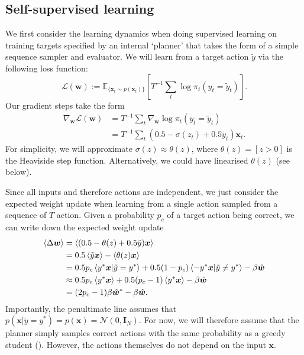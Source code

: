\documentclass{article}
\renewcommand\b\bm
\begin{document}
\subsection*{Self-supervised learning}

We first consider the learning dynamics when doing supervised learning on training targets specified by an internal `planner' that takes the form of a simple sequence sampler and evaluator.
We will learn from a target action $\tilde{y}$ via the following loss function:
\begin{equation}
    \mathcal{L}(\b{w}) := \mathbb{E}_{ \{ \b{x}_t \sim p(\b{x}_t) \} } \left [ T^{-1} \sum_t \log \pi_t (y_t = \tilde{y}_t) \right ].
\end{equation}
Our gradient steps take the form
\begin{align}
    \nabla_{\b{w}} \mathcal{L}(\b{w}) &= T^{-1} \sum_t \nabla_{\b{w}} \log \pi_t (y_t = \tilde{y}_t) \\
    &= T^{-1} \sum_t (0.5-\sigma(z_t)+0.5 \tilde{y}_t) \b{x}_t.
\end{align}
For simplicity, we will approximate $\sigma(z) \approx \theta(z)$, where $\theta(z) = [z > 0]$ is the Heaviside step function.
Alternatively, we could have linearised $\theta (z)$ (see below).

Since all inputs and therefore actions are independent, we just consider the expected weight update when learning from a single action sampled from a sequence of $T$ action.
Given a probability $p_c$ of a target action being correct, we can write down the expected weight update
\begin{align}
    \braket{\Delta \b{w}} &= \braket{(0.5-\theta(z)+0.5 \tilde{y}) \b{x}} \\
    &= 0.5 \braket{\tilde{y} \b{x}} - \braket{\theta(z) \b{x}}\\
    &= 0.5 p_c \braket{y^* \b{x} | \tilde{y} = y^*} + 0.5 (1-p_c) \braket{ - y^* \b{x} | \tilde{y} \neq y^*} - \beta \hat{\b{w}}\\
    &\approx 0.5 p_c \braket{y^* \b{x}} + 0.5 (p_c-1) \braket{ y^* \b{x}} - \beta \hat{\b{w}}\\
    &= (2 p_c - 1) \beta \hat{\b{w}}^* - \beta \hat{\b{w}}.
\end{align}
Importantly, the penultimate line assumes that $p(\b{x} | \tilde{y}=y^*) = p(\b{x}) = \mathcal{N}(0, \b{I}_N)$.
For now, we will therefore assume that the planner simply samples correct actions with the same probability as a greedy student ().
However, the actions themselves do not depend on the input $\b{x}$.
\end{document}
